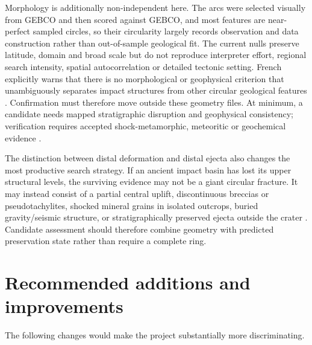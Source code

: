\documentclass[11pt]{article}
\begin{document}
Morphology is additionally non-independent here. The arcs were selected visually from GEBCO and then scored against GEBCO, and most features are near-perfect sampled circles, so their circularity largely records observation and data construction rather than out-of-sample geological fit. The current nulls preserve latitude, domain and broad scale but do not reproduce interpreter effort, regional search intensity, spatial autocorrelation or detailed tectonic setting. French explicitly warns that there is no morphological or geophysical criterion that unambiguously separates impact structures from other circular geological features \cite[pp.~97--99]{French1998}. Confirmation must therefore move outside these geometry files. At minimum, a candidate needs mapped stratigraphic disruption and geophysical consistency; verification requires accepted shock-metamorphic, meteoritic or geochemical evidence \cite{French1998,FrenchKoeberl2010,Osinski2022}.

The distinction between distal deformation and distal ejecta also changes the most productive search strategy. If an ancient impact basin has lost its upper structural levels, the surviving evidence may not be a giant circular fracture. It may instead consist of a partial central uplift, discontinuous breccias or pseudotachylites, shocked mineral grains in isolated outcrops, buried gravity/seismic structure, or stratigraphically preserved ejecta outside the crater \cite[pp.~28--30, 78, 97--103]{French1998}. Candidate assessment should therefore combine geometry with predicted preservation state rather than require a complete ring.

\section{Recommended additions and improvements}
The following changes would make the project substantially more discriminating.
\end{document}
